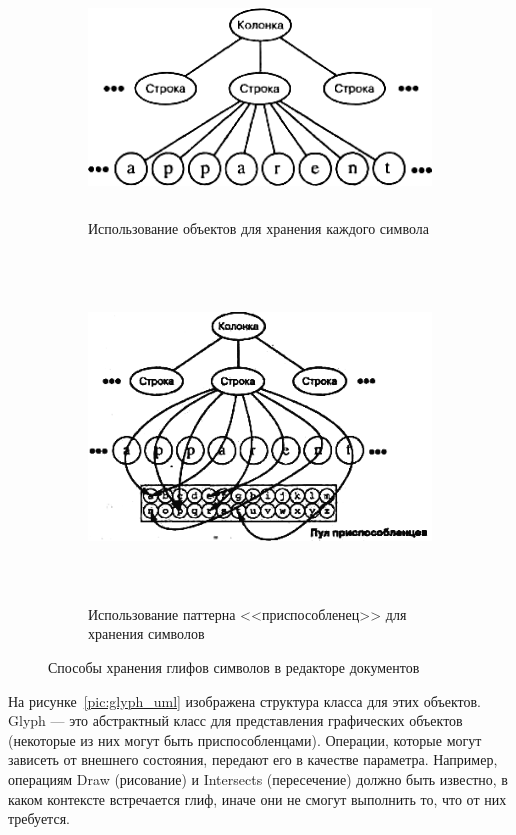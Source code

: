 \begin{figure}[htbp]
  \centering
  \begin{subfigure}[b]{\textwidth}
    \centering
    \includegraphics[width=150mm,height=62mm]{pic/text_objs_repr}
    \caption{Использование объектов для хранения каждого символа}
    \label{pic:sym_storage_objs}
  \end{subfigure}

  \bigskip
  
  \begin{subfigure}[b]{\textwidth}
    \centering
    \includegraphics[width=150mm,height=92mm]{pic/text_fly_repr}
    \caption{Использование паттерна <<приспособленец>> для хранения символов}
    \label{pic:sym_storage_fly}
  \end{subfigure}
  \caption{Способы хранения глифов символов в редакторе документов}
  \label{pic:sym_storage_schemes}
\end{figure}

На рисунке~\ref{pic:glyph_uml} изображена структура класса для этих объектов.
Glyph --- это абстрактный класс для представления графических объектов
(некоторые из них могут быть приспособленцами).
Операции, которые могут зависеть от внешнего состояния, передают его в качестве параметра.
Например, операциям Draw (рисование) и Intersects (пересечение) должно быть известно,
в каком контексте встречается глиф, иначе они не смогут выполнить то, что от них требуется.

